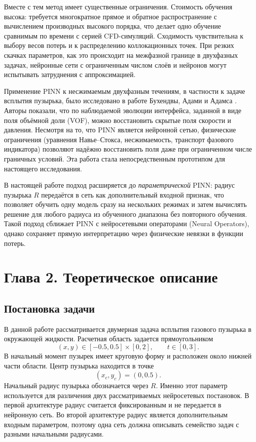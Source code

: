\documentclass[12pt,a4paper]{article}
\begin{document}
Вместе с тем метод имеет существенные ограничения. Стоимость обучения высока:
требуется многократное прямое и обратное распространение с вычислением
производных высокого порядка, что делает одно обучение сравнимым по времени
с серией CFD-симуляций. Сходимость чувствительна к выбору весов потерь и к
распределению коллокационных точек. При резких скачках параметров, как это
происходит на межфазной границе в двухфазных задачах, нейронные сети с
ограниченным числом слоёв и нейронов могут испытывать затруднения с
аппроксимацией.

Применение PINN к несжимаемым двухфазным течениям, в частности к задаче
всплытия пузырька, было исследовано в работе Бухендвы, Адами и Адамса
\cite{Buhendwa2021}. Авторы показали, что по наблюдаемой эволюции интерфейса,
заданной в виде поля объёмной доли (VOF), можно восстановить скрытые поля
скорости и давления. Несмотря на то, что PINN является нейронной сетью,
физические ограничения (уравнения Навье--Стокса, несжимаемость,
транспорт фазового индикатора) позволяют надёжно восстановить поля даже
при ограниченном числе граничных условий. Эта работа стала непосредственным
прототипом для настоящего исследования.

В настоящей работе подход расширяется до \emph{параметрической} PINN: радиус
пузырька $R$ передаётся в сеть как дополнительный входной признак, что
позволяет обучить одну модель сразу на нескольких режимах и затем вычислять
решение для любого радиуса из обученного диапазона без повторного обучения.
Такой подход сближает PINN с нейросетевыми операторами (Neural Operators),
однако сохраняет прямую интерпретацию через физические невязки в функции
потерь.

\section{Глава 2. Теоретическое описание}

\subsection{Постановка задачи}

В данной работе рассматривается двумерная задача всплытия газового пузырька в
окружающей жидкости. Расчетная область задается прямоугольником
\[
    (x,y)\in[-0.5,0.5]\times[0,2],
    \qquad
    t\in[0,3].
\]
В начальный момент пузырек имеет круговую форму и расположен около нижней части
области. Центр пузырька находится в точке
\[
    (x_c,y_c)=(0,0.5).
\]
Начальный радиус пузырька обозначается через \(R\). Именно этот параметр
используется для различения двух рассматриваемых нейросетевых постановок. В
первой архитектуре радиус считается фиксированным и не передается в нейронную
сеть. Во второй архитектуре радиус является дополнительным входным параметром,
поэтому одна сеть должна описывать семейство задач с разными начальными
радиусами.
\end{document}
